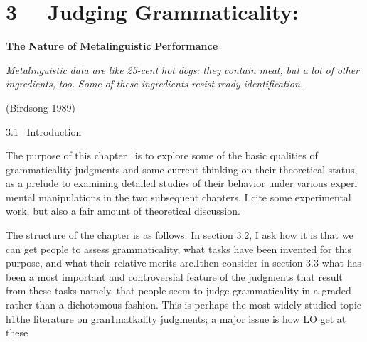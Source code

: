 \clearpage\setcounter{page}{1}\section[3 \ \ Judging Grammaticality:]{\textmd{3 \ }\textmd{\ }Judging Grammaticality:}
\begin{styleStandard}
\textbf{The}\textbf{ }\textbf{Nature}\textbf{ }\textbf{of}\textbf{ }\textbf{Metalinguistic}\textbf{ }\textbf{Performance}
\end{styleStandard}


\begin{styleStandard}
\textit{Metalinguistic}\textit{ }\textit{data}\textit{ }\textit{are}\textit{ }\textit{like}\textit{ }\textit{25-cent}\textit{ }\textit{hot}\textit{ }\textit{dogs:}\textit{ }\textit{they}\textit{ }\textit{contain}\textit{ }\textit{meat,}\textit{ }\textit{but}\textit{ }\textit{a}\textit{ }\textit{lot}\textit{ }\textit{of}\textit{ }\textit{other}\textit{ }\textit{ingredients,}\textit{ }\textit{too.}\textit{ }\textit{Some}\textit{ }\textit{of}\textit{ }\textit{these}\textit{ }\textit{ingredients}\textit{ }\textit{resist}\textit{ }\textit{ready}\textit{ }\textit{identification.}
\end{styleStandard}


\begin{styleStandard}
(Birdsong 1989)
\end{styleStandard}


\begin{styleHeadingvii}
3.1 \ Introduction
\end{styleHeadingvii}


\begin{styleStandard}
The purpose of this chapter \ is to explore some of the basic qualities of grammaticality judgments and some current thinking on their theoretical status, as a prelude to examining detailed studies of their behavior under various experi\- mental manipulations in the two subsequent chapters. I cite some experimental work, but also a fair amount of theoretical discussion.
\end{styleStandard}


\begin{styleStandard}
The structure of the chapter is as follows. In section 3.2, I ask how it is that we can get people to assess grammaticality, what tasks have been invented for this purpose, and what their relative merits are.Ithen consider in section 3.3 what has been a most important and controversial feature of the judgments that result from these tasks-namely, that people seem to judge grammaticality in a graded rather than a dichotomous fashion. This is perhaps the most widely studied topic h1the literature on gran1matkality judgments; a major issue is how LO get at these
\end{styleStandard}


